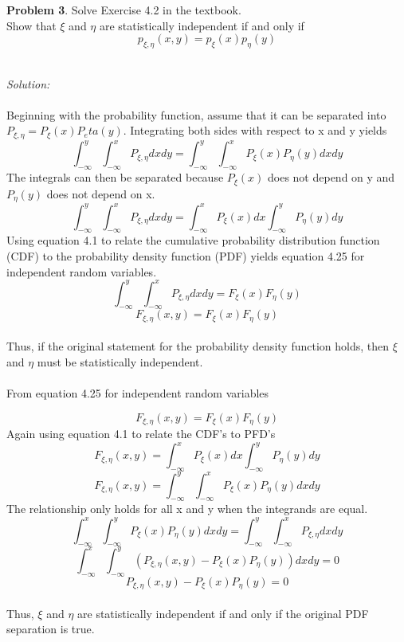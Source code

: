 \documentclass[10pt]{article}
\begin{document}
\newpage

\noindent\colorbox{mygray}{\begin{minipage}{\textwidth}
  {\bf Problem 3}.  Solve Exercise 4.2 in the textbook.\\ Show that \( \xi\) and \( \eta\) are statistically independent if and only if 
\[ p_{\xi,\eta}(x,y)=p_{\xi}(x)p_{\eta}(y) \]
\end{minipage}}
\\

{\em Solution:}   
\\
\\
Beginning with the probability function, assume that it can be separated into $P_{\xi,\eta}=P_\xi(x)P_eta(y)$. Integrating both sides with respect to x and y yields
\[ \int_{-\infty}^y \int_{-\infty}^x P_{\xi,\eta} dx dy = \int_{-\infty}^y \int_{-\infty}^x P_\xi(x)P_\eta(y)dxdy \]
The integrals can then be separated because $P_\xi(x)$ does not depend on y and $P_\eta(y)$ does not depend on x. 
\[ \int_{-\infty}^y \int_{-\infty}^x P_{\xi,\eta} dx dy = \int_{-\infty}^x P_\xi(x)dx \int_{-\infty}^y P_\eta(y)dy \]
Using equation 4.1 to relate the cumulative probability distribution function (CDF) to the probability density function (PDF) yields equation 4.25 for independent random variables. 
\[ \int_{-\infty}^y \int_{-\infty}^x P_{\xi,\eta} dx dy = F_\xi(x) F_\eta(y) \]
\[ F_{\xi,\eta}(x,y)= F_\xi(x) F_\eta(y)\]
\\
Thus, if the original statement for the probability density function holds, then $\xi$ and $\eta$ must be statistically independent. \\
\\
From equation 4.25 for independent random variables

\[ F_{\xi,\eta}(x,y)= F_\xi(x) F_\eta(y) \]
Again using equation 4.1 to relate the CDF's to PFD's
\[  F_{\xi,\eta}(x,y) = \int_{-\infty}^x P_\xi(x)dx \int_{-\infty}^y P_\eta(y)dy \]
\[ F_{\xi,\eta}(x,y) = \int_{-\infty}^y \int_{-\infty}^x  P_\xi(x)  P_\eta(y)dxdy \]
The relationship only holds for all x and y when the integrands are equal.
\[ \int_{-\infty}^x \int_{-\infty}^y P_\xi(x)  P_\eta(y) dx dy =  \int_{-\infty}^y \int_{-\infty}^x P_{\xi,\eta} dx dy \]
\[ \int_{-\infty}^x \int_{-\infty}^y \left( P_{\xi,\eta}(x,y)- P_\xi(x)  P_\eta(y)\right) dx dy =0 \]
\[ P_{\xi,\eta}(x,y)- P_\xi(x)  P_\eta(y) =0 \]
\\
Thus, $\xi$ and $\eta$ are statistically independent if and only if the original PDF separation is true.  
\end{document}
